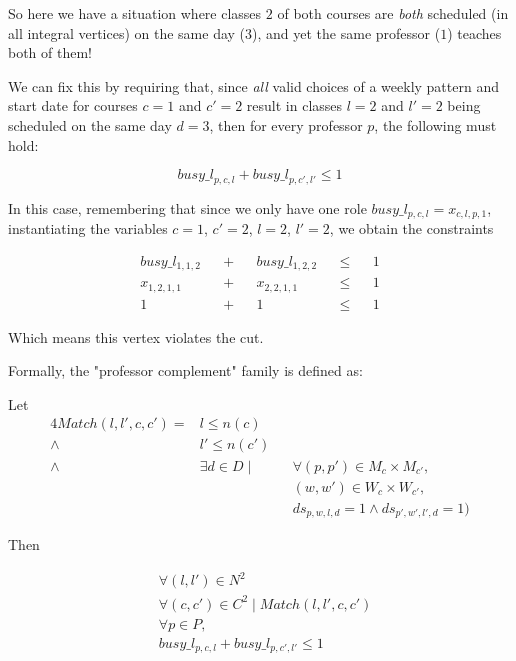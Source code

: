 So here we have a situation where classes $2$ of both courses are \emph{both} scheduled (in all integral vertices) on the same day ($3$), and yet the same professor ($1$) teaches both of them!

We can fix this by requiring that, since \emph{all} valid choices of a weekly pattern and start date for courses $c = 1$ and $c' = 2$ result in classes $l = 2$ and $l' = 2$ being scheduled on the same day $d = 3$, then for every professor $p$, the following must hold:

$$
busy\_l_{p, c, l} + busy\_l_{p, c', l'} \le 1
$$

In this case, remembering that since we only have one role $busy\_l_{p, c, l} = x_{c, l, p, 1}$, instantiating the variables $c = 1$, $c' = 2$, $l = 2$, $l' = 2$, we obtain the constraints

\begin{align*}
&busy\_l_{1, 1, 2}& &+& &busy\_l_{1, 2, 2}& &\le& &1&\\
&x_{1, 2, 1, 1}& &+& &x_{2, 2, 1, 1}& &\le& &1&\\
&1& &+& &1& &\le& &1&
\end{align*}

Which means this vertex violates the cut.

Formally, the "professor complement" family is defined as:

Let
\begin{alignat*}{4}
Match(l, l', c, c') = &l \le n(c)\\
                      \land &l' \le n(c') \\
                      \land &\exists d \in D \mid &&\forall (p, p') \in M_c \times M_{c'},\\
                      &                           &&(w, w') \in W_c \times W_{c'},\\
                      &                           &&ds_{p, w, l, d} = 1 \land ds_{p', w', l', d} = 1)
\end{alignat*}

Then

\begin{align*}
&\forall (l, l') \in N^2\\
&\forall (c, c') \in C^2 \mid Match(l, l', c, c')\\
&\forall p \in P,\\
&busy\_l_{p, c, l} + busy\_l_{p, c', l'} \le 1
\end{align*}
